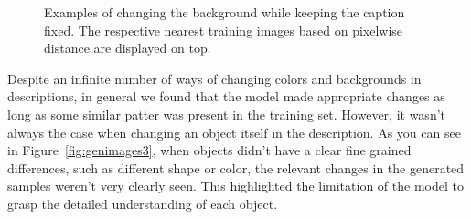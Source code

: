 \documentclass{article} %
\begin{document}
\begin{figure}[!h]
\begin{center}
%
\quad
%
\end{center}
\caption{Examples of changing the background while keeping the caption fixed. The respective nearest training images based on pixelwise distance are displayed on top.}
\label{fig:genimages2}
\vspace{-0.3cm}
\end{figure}

Despite an infinite number of ways of changing colors and backgrounds in descriptions, in general we found that the model made appropriate changes as long as some similar patter was present in the training set. However, it wasn't always the case when changing an object itself in the description. As you can see in Figure~\ref{fig:genimages3}, when objects didn't have a clear fine grained differences, such as different shape or color, the relevant changes in the generated samples weren't very clearly seen. This highlighted the limitation of the model to grasp the detailed understanding of each object.
 
\end{document}
